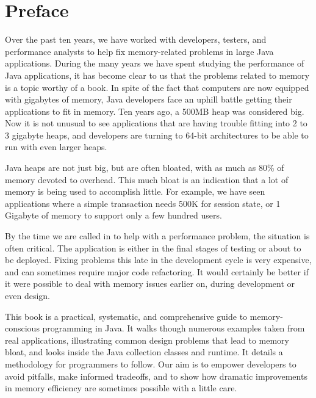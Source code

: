 \chapter{Preface}

Over the past ten years, we have worked with developers, testers, and performance analysts to help fix memory-related problems in large Java applications.
During the many years we have spent studying the performance of Java applications, it has become clear to us that the problems related to memory is a topic worthy of a book. 
In spite of the fact that computers are now equipped with gigabytes of memory, Java developers face an uphill battle getting their applications to fit in memory. Ten years ago, a 500MB heap was considered big. Now it is not unusual to see applications that are having trouble fitting into 2 to 3 gigabyte heaps, and developers are turning to 64-bit architectures to be able to run with even larger heaps.  

Java heaps are not just big, but are often bloated, with as much as 80\% of memory devoted to overhead. This much bloat is an indication that a lot of memory is being used to accomplish little. For example, we have seen applications where a simple transaction needs 500K for session state, or 1 Gigabyte of memory to support only a few hundred users. 

By the time we are called in to help with a performance problem, the situation is often critical. The application is either in the final stages of testing or about to be deployed. Fixing problems this late in the development cycle is very expensive, and can sometimes require major code refactoring. It would certainly be better if it were possible to deal with memory issues earlier on, during development or even design.


This book is a practical, systematic, and comprehensive guide to memory-conscious programming in Java. It walks though numerous examples taken from real applications, illustrating common design problems that lead to memory bloat, and looks inside the Java collection classes and runtime. It details a methodology for programmers to follow. Our aim is to empower developers to avoid pitfalls, make informed tradeoffs, and to show how dramatic improvements in memory efficiency are sometimes possible with a little care.

